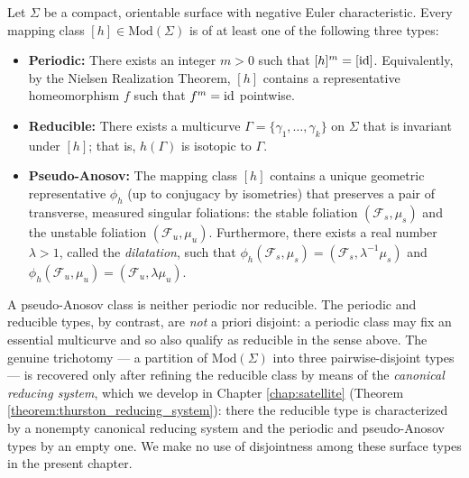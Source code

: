 % 
\begin{theorem}\label{theorem:nielsen-thruston classification}
Let $\Sigma$ be a compact, orientable surface with negative Euler characteristic. Every mapping class $[h] \in \mathrm{Mod}(\Sigma)$ is of at least one of the following three types:
\begin{itemize}
    \item \textbf{Periodic:} There exists an integer $m > 0$ such that $[h]^m = [\operatorname{id}]$. Equivalently, by the Nielsen Realization Theorem, $[h]$ contains a representative homeomorphism $f$ such that $f^m = \operatorname{id}$ pointwise.
    \item \textbf{Reducible:} There exists a multicurve $\Gamma = \{\gamma_1, \dots, \gamma_k\}$ on $\Sigma$ that is invariant under $[h]$; that is, $h(\Gamma)$ is isotopic to $\Gamma$.
    \item \textbf{Pseudo-Anosov:} The mapping class $[h]$ contains a unique geometric representative $\phi_h$ (up to conjugacy by isometries) that preserves a pair of transverse, measured singular foliations: the stable foliation $(\mathcal{F}_s, \mu_s)$ and the unstable foliation $(\mathcal{F}_u, \mu_u)$. Furthermore, there exists a real number $\lambda > 1$, called the \emph{dilatation}, such that $\phi_h(\mathcal{F}_s, \mu_s) = (\mathcal{F}_s, \lambda^{-1} \mu_s)$ and $\phi_h(\mathcal{F}_u, \mu_u) = (\mathcal{F}_u, \lambda \mu_u)$.
\end{itemize}
A pseudo-Anosov class is neither periodic nor reducible. The periodic and reducible types, by contrast, are \emph{not} a priori disjoint: a periodic class may fix an essential multicurve and so also qualify as reducible in the sense above. The genuine trichotomy --- a partition of $\mathrm{Mod}(\Sigma)$ into three pairwise-disjoint types --- is recovered only after refining the reducible class by means of the \emph{canonical reducing system}, which we develop in Chapter \ref{chap:satellite} (Theorem \ref{theorem:thurston_reducing_system}): there the reducible type is characterized by a nonempty canonical reducing system and the periodic and pseudo-Anosov types by an empty one. We make no use of disjointness among these surface types in the present chapter.
\end{theorem}

